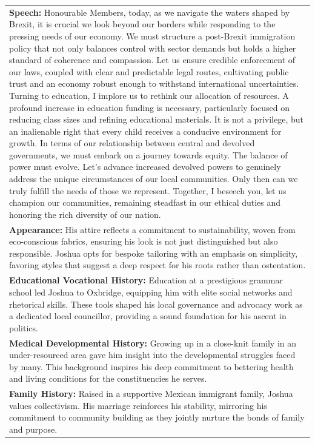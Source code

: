 \documentclass[11pt]{article}
\begin{document}
\begin{table}[ht]
\begin{tabularx}{\textwidth}{X}
\textbf{Speech:} Honourable Members, today, as we navigate the waters shaped by Brexit, it is crucial we look beyond our borders while responding to the pressing needs of our economy. We must structure a post-Brexit immigration policy that not only balances control with sector demands but holds a higher standard of coherence and compassion. Let us ensure credible enforcement of our laws, coupled with clear and predictable legal routes, cultivating public trust and an economy robust enough to withstand international uncertainties. Turning to education, I implore us to rethink our allocation of resources. A profound increase in education funding is necessary, particularly focused on reducing class sizes and refining educational materials. It is not a privilege, but an inalienable right that every child receives a conducive environment for growth. In terms of our relationship between central and devolved governments, we must embark on a journey towards equity. The balance of power must evolve. Let’s advance increased devolved powers to genuinely address the unique circumstances of our local communities. Only then can we truly fulfill the needs of those we represent. Together, I beseech you, let us champion our communities, remaining steadfast in our ethical duties and honoring the rich diversity of our nation. \\[4pt]

\textbf{Appearance:} His attire reflects a commitment to sustainability, woven from eco-conscious fabrics, ensuring his look is not just distinguished but also responsible. Joshua opts for bespoke tailoring with an emphasis on simplicity, favoring styles that suggest a deep respect for his roots rather than ostentation. \\[4pt]

\textbf{Educational Vocational History:} Education at a prestigious grammar school led Joshua to Oxbridge, equipping him with elite social networks and rhetorical skills. These tools shaped his local governance and advocacy work as a dedicated local councillor, providing a sound foundation for his ascent in politics. \\[4pt]

\textbf{Medical Developmental History:} Growing up in a close-knit family in an under-resourced area gave him insight into the developmental struggles faced by many. This background inspires his deep commitment to bettering health and living conditions for the constituencies he serves. \\[4pt]

\textbf{Family History:} Raised in a supportive Mexican immigrant family, Joshua values collectivism. His marriage reinforces his stability, mirroring his commitment to community building as they jointly nurture the bonds of family and purpose. \\[4pt]

\bottomrule
\end{tabularx}
\end{table}
\end{document}

